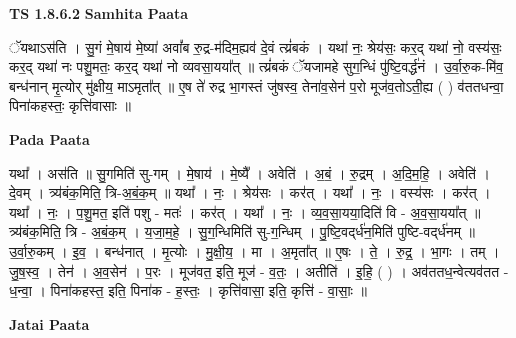 \documentclass[17pt]{extarticle}
\begin{document}
\textbf{TS 1.8.6.2 } \newline
\textbf{Samhita Paata} \newline

ॅयथाऽस॑ति । सु॒गं मे॒षाय॑ मे॒ष्या॑ अवां᳚ब रु॒द्र-म॑दिम॒ह्यव॑ दे॒वं त्य्रं॑बकं । यथा॑ नः॒ श्रेय॑सः॒ कर॒द् यथा॑ नो॒ वस्य॑सः॒ कर॒द् यथा॑ नः पशु॒मतः॒ कर॒द् यथा॑ नो व्यवसा॒यया᳚त् ॥ त्य्रं॑बकं ॅयजामहे सुग॒न्धिं पु॑ष्टि॒वर्द्ध॑नं । उ॒र्वा॒रु॒क-मि॑व॒ बन्ध॑नान् मृ॒त्योर् मु॑क्षीय॒ माऽमृता᳚त् ॥ ए॒ष ते॑ रुद्र भा॒गस्तं जु॑षस्व॒ तेना॑व॒सेन॑ प॒रो मूज॑व॒तोऽती॒ह्य ( ) व॑ततधन्वा॒ पिना॑कहस्तः॒ कृत्ति॑वासाः ॥ \newline

\textbf{Pada Paata} \newline

यथा᳚ । अस॑ति ॥ सु॒गमिति॑ सु-गम् । मे॒षाय॑ । मे॒ष्यै᳚ । अवेति॑ । अ॒बं॒ । रु॒द्रम् । अ॒दि॒म॒हि॒ । अवेति॑ । दे॒वम् । त्र्य॑बंक॒मिति॒ त्रि-अ॒बं॒क॒म् ॥ यथा᳚ । नः॒ । श्रेय॑सः । कर॑त् । यथा᳚ । नः॒ । वस्य॑सः । कर॑त् । यथा᳚ । नः॒ । प॒शु॒मत॒ इति॑ पशु - मतः॑ । कर॑त् । यथा᳚ । नः॒ । व्य॒व॒सा॒यया॒दिति॑ वि - अ॒व॒सा॒यया᳚त् ॥ त्र्य॑बंक॒मिति॒ त्रि - अ॒बं॒क॒म् । य॒जा॒म॒हे॒ । सु॒ग॒न्धिमिति॑ सु-ग॒न्धिम् । पु॒ष्टि॒वद्‌र्ध॑न॒मिति॑ पुष्टि-वद्‌र्ध॑नम् ॥ उ॒र्वा॒रु॒कम् । इ॒व॒ । बन्ध॑नात् । मृ॒त्योः । मु॒क्षी॒य॒ । मा । अ॒मृता᳚त् ॥ ए॒षः । ते॒ । रु॒द्र॒ । भा॒गः । तम् । जु॒ष॒स्व॒ । तेन॑ । अ॒व॒सेन॑ । प॒रः । मूज॑वत॒ इति॒ मूज॑ - व॒तः॒ । अतीति॑ । इ॒हि॒ ( ) । अव॑ततध॒न्वेत्यव॑तत - ध॒न्वा॒ । पिना॑कहस्त॒ इति॒ पिना॑क - ह॒स्तः॒ । कृत्ति॑वासा॒ इति॒ कृत्ति॑ - वा॒साः॒ ॥  \newline



\textbf{Jatai Paata} \newline
\end{document}
